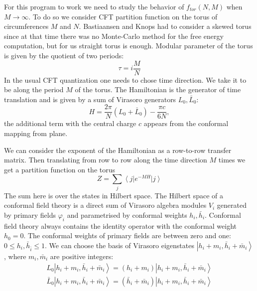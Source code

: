 \documentclass[aps,prl,reprint]{revtex4-1}
\begin{document}
For this program to work we need to study the behavior  of $f_{tor}(N,M)$ when $M\to\infty$.
To do so we consider CFT partition function on the torus of circumferences $M$ and $N$.
  Bastiaansen and Knops \cite{bastiaansen1998monte} had to consider a skewed torus since at
that time there was no Monte-Carlo method for the free energy computation, but for us straight torus is
enough. Modular parameter of the torus is given by the quotient of two periods:
\begin{equation}
  \label{eq:2}
  \tau=i\frac{M}{N}
\end{equation}
In the usual CFT quantization one needs to chose time direction. We take it to be along the
period $M$ of the torus. The Hamiltonian is the generator of time translation and is given by a sum
of Virasoro generators $L_{0}, \bar L_{0}$:
\begin{equation}
  \label{eq:3}
  H=\frac{2\pi}{N} (L_{0}+\bar L_{0})-\frac{\pi c}{6 N},
\end{equation}
the additional term with the central charge $c$ appears from the conformal mapping from plane. 

We can consider the exponent of the Hamiltonian as a row-to-row transfer matrix. Then translating
from row to row along the time direction $M$ times we get a partition function  on the torus
\begin{equation}
  \label{eq:1}
  Z=\sum_{j} \left<j\right|e^{-M H} \left|j\right>
\end{equation}
The sum here is over the states in Hilbert space. 
The Hilbert space of a conformal field theory is a direct sum of Virasoro algebra modules $V_{i}$ generated
by primary fields $\varphi_{i}$ and parametrised by conformal weights $h_{i}, \bar h_{i}$. Conformal
field theory always contains the identity operator with the conformal weight $h_{0}=0$. The
conformal weights of primary fields are between zero and one:  $0\leq h_{i},\bar h_{\bar i}\leq 1$. We can
choose the basis of Virasoro eigenstates $\left|h_{i}+m_{i},\bar h_{i}+\bar m_{i}\right>$, where
$m_{i},\bar m_{i}$ are positive integers:
\begin{equation}
  \label{eq:4}
  \begin{array}{l}
    L_{0}\left|h_{i}+m_{i},\bar h_{i}+\bar m_{i}\right>=(h_{i}+m_{i})\left|h_{i}+m_{i},\bar h_{i}+\bar
    m_{i}\right>\\
  \bar L_{0}\left|h_{i}+m_{i},\bar h_{i}+\bar m_{i}\right>=(\bar h_{i}+\bar m_{i})\left|h_{i}+m_{i},\bar h_{i}+\bar
    m_{i}\right>    
  \end{array}
\end{equation}
\end{document}
